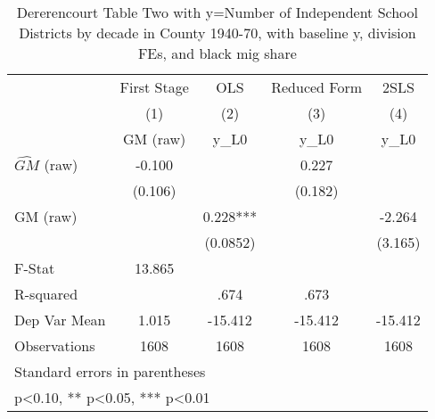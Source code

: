 \begin{table}[htbp]\centering
\def\sym#1{\ifmmode^{#1}\else\(^{#1}\)\fi}
\caption{Dererencourt Table Two with y=Number of Independent School Districts by decade in County 1940-70, with baseline y, division FEs, and black mig share}
\begin{tabular}{l*{4}{c}}
\toprule
                    & First Stage   &         OLS   &Reduced Form   &        2SLS   \\
                    &\multicolumn{1}{c}{(1)}&\multicolumn{1}{c}{(2)}&\multicolumn{1}{c}{(3)}&\multicolumn{1}{c}{(4)}\\
                    &\multicolumn{1}{c}{GM  (raw)}&\multicolumn{1}{c}{y\_L0}&\multicolumn{1}{c}{y\_L0}&\multicolumn{1}{c}{y\_L0}\\
\midrule
$\hat{GM}$ (raw)    &      -0.100   &               &       0.227   &               \\
                    &     (0.106)   &               &     (0.182)   &               \\
\addlinespace
GM  (raw)           &               &       0.228***&               &      -2.264   \\
                    &               &    (0.0852)   &               &     (3.165)   \\
\midrule
F-Stat              &      13.865   &               &               &               \\
R-squared           &               &        .674   &        .673   &               \\
Dep Var Mean        &       1.015   &     -15.412   &     -15.412   &     -15.412   \\
Observations        &        1608   &        1608   &        1608   &        1608   \\
\bottomrule
\multicolumn{5}{l}{\footnotesize Standard errors in parentheses}\\
\multicolumn{5}{l}{\footnotesize * p<0.10, ** p<0.05, *** p<0.01}\\
\end{tabular}
\end{table}
